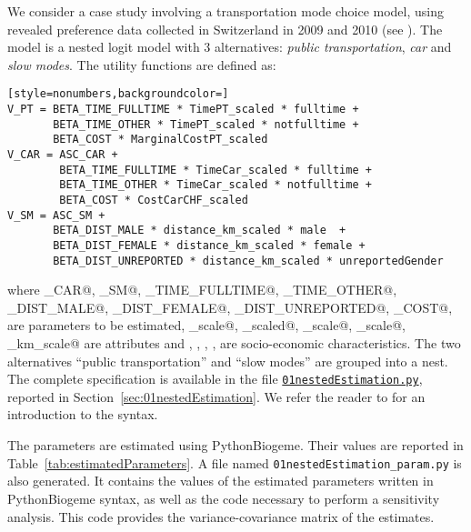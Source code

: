 \documentclass[12pt,a4paper]{article}
\begin{document}
We consider a case study involving a transportation mode choice model,
using revealed preference data collected in Switzerland in 2009 and
2010 (see \cite{AtaGlerBier2012_DISP}).
The model is a nested logit model with 3 alternatives: \emph{public
  transportation}, \emph{car} and \emph{slow modes}. The utility functions are defined as:
\begin{lstlisting}[style=nonumbers,backgroundcolor=]
V_PT = BETA_TIME_FULLTIME * TimePT_scaled * fulltime +
       BETA_TIME_OTHER * TimePT_scaled * notfulltime +
       BETA_COST * MarginalCostPT_scaled
V_CAR = ASC_CAR +
        BETA_TIME_FULLTIME * TimeCar_scaled * fulltime +
        BETA_TIME_OTHER * TimeCar_scaled * notfulltime +
        BETA_COST * CostCarCHF_scaled
V_SM = ASC_SM +
       BETA_DIST_MALE * distance_km_scaled * male  +
       BETA_DIST_FEMALE * distance_km_scaled * female +
       BETA_DIST_UNREPORTED * distance_km_scaled * unreportedGender
\end{lstlisting}
where
\lstinline@ASC_CAR@, 
\lstinline@ASC_SM@, 
\lstinline@BETA_TIME_FULLTIME@, 
\lstinline@BETA_TIME_OTHER@, 
\lstinline@BETA_DIST_MALE@, 
\lstinline@BETA_DIST_FEMALE@, 
\lstinline@BETA_DIST_UNREPORTED@, 
\lstinline@BETA_COST@, 
are parameters to be estimated,  
\lstinline@TimePT_scale@,  
\lstinline@MarginalCostPT_scaled@,  
\lstinline@TimeCar_scale@, 
\lstinline@CostCarCHF_scale@, 
\lstinline@distance_km_scale@
are attributes and
\lstinline@fulltime@, 
\lstinline@notfulltime@,  
\lstinline@male@, 
\lstinline@female@, 
\lstinline@unreportedGender@ are socio-economic characteristics.
The two alternatives ``public transportation'' and ``slow modes'' are
grouped into a nest. 
The complete specification is available in the file \href{http://biogeme.epfl.ch/examples/indicators/python/01nestedEstimation.py}{\lstinline$01nestedEstimation.py$}, reported in
Section~\ref{sec:01nestedEstimation}. We refer the reader to
 for an introduction to the syntax. 

The parameters are estimated using PythonBiogeme. Their values are
reported in Table~\ref{tab:estimatedParameters}. A file named
\lstinline$01nestedEstimation_param.py$ is also generated. It contains
the values of the estimated parameters written in PythonBiogeme
syntax, as well as the code necessary to perform a sensitivity
analysis. This code provides the variance-covariance matrix of the
estimates.
\end{document}
